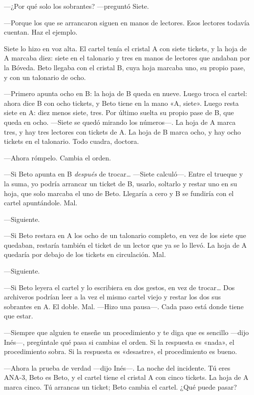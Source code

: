 ---¿Por qué solo los sobrantes? ---preguntó Siete.

---Porque los que se arrancaron siguen en manos de lectores. Esos lectores todavía cuentan. Haz el ejemplo.

Siete lo hizo en voz alta. El cartel tenía el cristal A con siete tickets, y la hoja de A marcaba diez: siete en el talonario y tres en manos de lectores que andaban por la Bóveda. Beto llegaba con el cristal B, cuya hoja marcaba uno, su propio pase, y con un talonario de ocho.

---Primero apunta ocho en B: la hoja de B queda en nueve. Luego troca el cartel: ahora dice B con ocho tickets, y Beto tiene en la mano «A, siete». Luego resta siete en A: diez menos siete, tres. Por último suelta su propio pase de B, que queda en ocho. ---Siete se quedó mirando los números---\nobreak. La hoja de A marca tres, y hay tres lectores con tickets de A. La hoja de B marca ocho, y hay ocho tickets en el talonario. Todo cuadra, doctora.

---Ahora rómpelo. Cambia el orden.

---Si Beto apunta en B \emph{después} de trocar\ldots{} ---Siete calculó---\nobreak. Entre el trueque y la suma, yo podría arrancar un ticket de B, usarlo, soltarlo y restar uno en su hoja, que solo marcaba el uno de Beto. Llegaría a cero y B se fundiría con el cartel apuntándole. Mal.

---Siguiente.

---Si Beto restara en A los ocho de un talonario completo, en vez de los siete que quedaban, restaría también el ticket de un lector que ya se lo llevó. La hoja de A quedaría por debajo de los tickets en circulación. Mal.

---Siguiente.

---Si Beto leyera el cartel y lo escribiera en dos gestos, en vez de trocar\ldots{} Dos archiveros podrían leer a la vez el mismo cartel viejo y restar los dos sus sobrantes en A. El doble. Mal. ---Hizo una pausa---\nobreak. Cada paso está donde tiene que estar.

---Siempre que alguien te enseñe un procedimiento y te diga que es sencillo ---dijo Inés---\nobreak, pregúntale qué pasa si cambias el orden. Si la respuesta es «nada», el procedimiento sobra. Si la respuesta es «desastre», el procedimiento es bueno.

\escena
---Ahora la prueba de verdad ---dijo Inés---\nobreak. La noche del incidente. Tú eres ANA-3, Beto es Beto, y el cartel tiene el cristal A con cinco tickets. La hoja de A marca cinco. Tú arrancas un ticket; Beto cambia el cartel. ¿Qué puede pasar?


